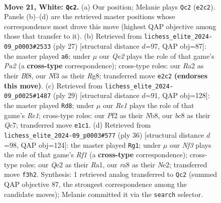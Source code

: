 \documentclass[11pt]{article}
\begin{document}
\clearpage

\begin{figure}[p]\centering
\begin{subfigure}{0.46\textwidth}\centering
\resizebox{\linewidth}{!}{%
\newchessgame
\chessboard[
  setfen={rqb1k2r/p3b1pp/1pn5/3p1p1n/Pp1P3P/4PNPB/RB2QP2/1N2R1K1 w - - 5 21},
  showmover=false,
  pgfstyle=straightmove, color=movearrow, markmove={e2-c2}
]}
\caption{}
\end{subfigure}\hfill
\begin{subfigure}{0.46\textwidth}\centering
\resizebox{\linewidth}{!}{%
\newchessgame
\chessboard[
  setfen={r3kbr1/pb1q1p2/2p1pn2/1p4pp/2pPP3/2N3B1/PP2BPPP/R1QR2K1 b q - 3 14},
  showmover=false,
  pgfstyle=straightmove, color=movearrow, markmove={a7-a6}
]}
\caption{}
\end{subfigure}
\\[4pt]
\begin{subfigure}{0.46\textwidth}\centering
\resizebox{\linewidth}{!}{%
\newchessgame
\chessboard[
  setfen={1nb1r1k1/2q1rpbp/pp1p1np1/2pP4/P1N1PB2/2NB3P/1P3PP1/R2QR1K1 b - - 7 15},
  showmover=false,
  pgfstyle=straightmove, color=movearrow, markmove={e8-d8}
]}
\caption{}
\end{subfigure}\hfill
\begin{subfigure}{0.46\textwidth}\centering
\resizebox{\linewidth}{!}{%
\newchessgame
\chessboard[
  setfen={r2q1r2/pp2b2k/2n1p2p/3pPp2/1P1P1P1n/P1NQB3/4N2P/R4R1K w - - 2 19},
  showmover=false,
  pgfstyle=straightmove, color=movearrow, markmove={f1-g1}
]}
\caption{}
\end{subfigure}
\caption{\textbf{Move 21, White: \texttt{Qc2}.} (a) Our position; Melanie plays \texttt{Qc2} (\texttt{e2c2}). Panels (b)--(d) are the retrieved master positions whose correspondence most drove this move (highest QAP objective among those that transfer to it). (b) Retrieved from \texttt{lichess\_elite\_2024-09\_p0003\#2533} (ply 27) [structural distance $d$=97, QAP obj=87]: the master played \texttt{a6}; under $\mu$ our \emph{Qe2} plays the role of that game's \emph{Pa2} (a \textbf{cross-type} correspondence); cross-type roles: our \emph{R}a2 as their \emph{B}f8, our \emph{N}f3 as their \emph{R}g8; transferred move \texttt{e2c2} \textbf{(endorses this move)}. (c) Retrieved from \texttt{lichess\_elite\_2024-09\_p0025\#1487} (ply 29) [structural distance $d$=91, QAP obj=128]: the master played \texttt{Rd8}; under $\mu$ our \emph{Re1} plays the role of that game's \emph{Re1}; cross-type roles: our \emph{P}f2 as their \emph{N}b8, our \emph{b}c8 as their \emph{Q}c7; transferred move \texttt{e1c1}. (d) Retrieved from \texttt{lichess\_elite\_2024-09\_p0003\#577} (ply 36) [structural distance $d$=98, QAP obj=124]: the master played \texttt{Rg1}; under $\mu$ our \emph{Nf3} plays the role of that game's \emph{Rf1} (a \textbf{cross-type} correspondence); cross-type roles: our \emph{Q}e2 as their \emph{R}a1, our \emph{r}a8 as their \emph{N}e2; transferred move \texttt{f3h2}. Synthesis: 1 retrieved analog transferred to \texttt{Qc2} (summed QAP objective 87, the strongest correspondence among the candidate moves); Melanie committed it via the \texttt{search} selector.}
\label{fig:thought-m40}
\end{figure}
\end{document}
